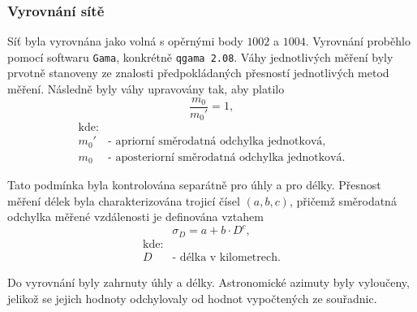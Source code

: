 \subsubsection{Vyrovnání sítě}

\tab Síť byla vyrovnána jako volná s opěrnými body $1002$ a $1004$. Vyrovnání proběhlo pomocí softwaru \texttt{Gama}, konkrétně \texttt{qgama 2.08}. Váhy jednotlivých měření byly prvotně stanoveny ze znalosti předpokládaných přesností jednotlivých metod měření. Následně byly váhy upravovány tak, aby platilo
\[
\frac{m_0}{m_0'} = 1 ,
\]
\[
\begin{array}{ll}
\text{kde:}& \\
m_0' & \text{- apriorní směrodatná odchylka jednotková}, \\[6pt]
m_0  & \text{- aposteriorní směrodatná odchylka jednotková}.
\end{array}
\]

\tab Tato podmínka byla kontrolována separátně pro úhly a pro délky. 
Přesnost měření délek byla charakterizována trojicí čísel $(a,b,c)$, 
přičemž směrodatná odchylka měřené vzdálenosti je definována vztahem
\[
\sigma_D = a + b \cdot D^c ,
\]
\[
\begin{array}{ll}
\text{kde:}& \\
D & \text{- délka v kilometrech}.
\end{array}
\]

\tab Do vyrovnání byly zahrnuty úhly a délky. Astronomické azimuty byly vyloučeny, jelikož se jejich hodnoty odchylovaly od hodnot vypočtených ze souřadnic.
